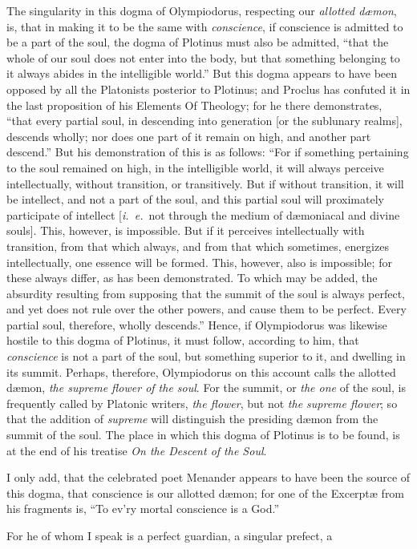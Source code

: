 \documentclass[12pt]{article}
\begin{document}
{The singularity in this dogma of Olympiodorus, respecting our \textit{allotted
d{\ae}mon}, is, that in making it to be the same with \textit{conscience}, if
conscience is admitted to be a part of the soul, the dogma of Plotinus must
also be admitted, ``that the whole of our soul does not enter into the body,
but that something belonging to it always abides in the intelligible world.''
But this dogma appears to have been opposed by all the Platonists posterior to
Plotinus; and Proclus has confuted it in the last proposition of his
Elements Of Theology; for he there demonstrates, ``that every partial
soul, in descending into generation [or the sublunary realms], descends wholly;
nor does one part of it remain on high, and another part descend.'' But his
demonstration of this is as follows: ``For if something pertaining to the soul
remained on high, in the intelligible world, it will always perceive
intellectually, without transition, or transitively. But if without transition,
it will be intellect, and not a part of the soul, and this partial soul will
proximately participate of intellect [\textit{i.~e.}~not through the medium of
d{\ae}moniacal and divine souls]. This, however, is impossible. But if it
perceives intellectually with transition, from that which always, and from that
which sometimes, energizes intellectually, one essence will be formed. This,
however, also is impossible; for these always differ, as has been demonstrated.
To which may be added, the absurdity resulting from supposing that the summit
of the soul is always perfect, and yet does not rule over the other powers, and
cause them to be perfect. Every partial soul, therefore, wholly descends.''
Hence, if Olympiodorus was likewise hostile to this dogma of Plotinus, it must
follow, according to him, that \textit{conscience} is not a part of the soul,
but something superior to it, and dwelling in its summit. Perhaps, therefore,
Olympiodorus on this account calls the allotted d{\ae}mon, \textit{the supreme
flower of the soul}. For the summit, or \textit{the one} of the soul, is
frequently called by Platonic writers, \textit{the flower}, but not \textit{the
supreme flower}; so that the addition of \textit{supreme} will distinguish the
presiding d{\ae}mon from the summit of the soul. The place in which this dogma
of Plotinus is to be found, is at the end of his treatise \textit{On the
Descent of the Soul}.

I only add, that the celebrated poet Menander appears to have been the source
of this dogma, that conscience is our allotted d{\ae}mon; for one of the
Excerpt{\ae} from his fragments is, ``To ev'ry mortal conscience is a
God.''} For he of whom I speak is a perfect guardian, a singular prefect, a
\end{document}
